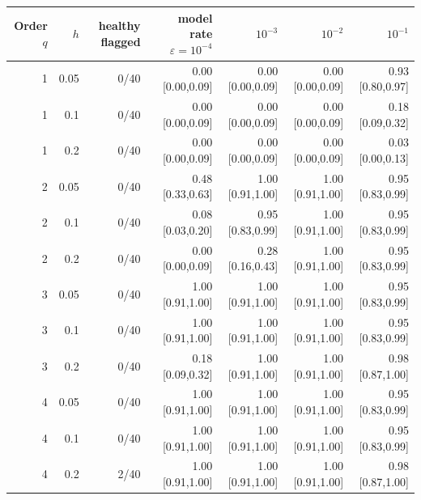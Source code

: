 \begin{tabular}{rrrrrrr}
\toprule
Order $q$ & $h$ & healthy flagged & model rate $\varepsilon{=}10^{-4}$ & $10^{-3}$ & $10^{-2}$ & $10^{-1}$ \\
\midrule
1 & 0.05 & 0/40 & 0.00 [0.00,0.09] & 0.00 [0.00,0.09] & 0.00 [0.00,0.09] & 0.93 [0.80,0.97] \\
1 & 0.1 & 0/40 & 0.00 [0.00,0.09] & 0.00 [0.00,0.09] & 0.00 [0.00,0.09] & 0.18 [0.09,0.32] \\
1 & 0.2 & 0/40 & 0.00 [0.00,0.09] & 0.00 [0.00,0.09] & 0.00 [0.00,0.09] & 0.03 [0.00,0.13] \\
2 & 0.05 & 0/40 & 0.48 [0.33,0.63] & 1.00 [0.91,1.00] & 1.00 [0.91,1.00] & 0.95 [0.83,0.99] \\
2 & 0.1 & 0/40 & 0.08 [0.03,0.20] & 0.95 [0.83,0.99] & 1.00 [0.91,1.00] & 0.95 [0.83,0.99] \\
2 & 0.2 & 0/40 & 0.00 [0.00,0.09] & 0.28 [0.16,0.43] & 1.00 [0.91,1.00] & 0.95 [0.83,0.99] \\
3 & 0.05 & 0/40 & 1.00 [0.91,1.00] & 1.00 [0.91,1.00] & 1.00 [0.91,1.00] & 0.95 [0.83,0.99] \\
3 & 0.1 & 0/40 & 1.00 [0.91,1.00] & 1.00 [0.91,1.00] & 1.00 [0.91,1.00] & 0.95 [0.83,0.99] \\
3 & 0.2 & 0/40 & 0.18 [0.09,0.32] & 1.00 [0.91,1.00] & 1.00 [0.91,1.00] & 0.98 [0.87,1.00] \\
4 & 0.05 & 0/40 & 1.00 [0.91,1.00] & 1.00 [0.91,1.00] & 1.00 [0.91,1.00] & 0.95 [0.83,0.99] \\
4 & 0.1 & 0/40 & 1.00 [0.91,1.00] & 1.00 [0.91,1.00] & 1.00 [0.91,1.00] & 0.95 [0.83,0.99] \\
4 & 0.2 & 2/40 & 1.00 [0.91,1.00] & 1.00 [0.91,1.00] & 1.00 [0.91,1.00] & 0.98 [0.87,1.00] \\
\bottomrule
\end{tabular}
